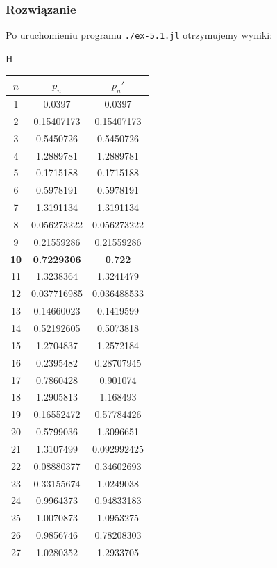 \documentclass[10pt]{article}
\begin{document}
\subsubsection{Rozwiązanie}

Po uruchomieniu programu \texttt{./ex-5.1.jl} otrzymujemy wyniki:
\begin{center}{H}
    \begin{tabular}{|c| c c |}
        \hline
        $n$ & $p_n$ & $p_n'$\\
        \hline\hline
        1 & 0.0397 & 0.0397\\
        2 & 0.15407173 & 0.15407173\\
        3 & 0.5450726 & 0.5450726\\
        4 & 1.2889781 & 1.2889781\\
        5 & 0.1715188 & 0.1715188\\
        6 & 0.5978191 & 0.5978191\\
        7 & 1.3191134 & 1.3191134\\
        8 & 0.056273222 & 0.056273222\\
        9 & 0.21559286 & 0.21559286\\
        \textbf{10} & \textbf{0.7229306} & \textbf{0.722}\\
        11 & 1.3238364 & 1.3241479\\
        12 & 0.037716985 & 0.036488533\\
        13 & 0.14660023 & 0.1419599\\
        14 & 0.52192605 & 0.5073818\\
        15 & 1.2704837 & 1.2572184\\
        16 & 0.2395482 & 0.28707945\\
        17 & 0.7860428 & 0.901074\\
        18 & 1.2905813 & 1.168493\\
        19 & 0.16552472 & 0.57784426\\
        20 & 0.5799036 & 1.3096651\\
        21 & 1.3107499 & 0.092992425\\
        22 & 0.08880377 & 0.34602693\\
        23 & 0.33155674 & 1.0249038\\
        24 & 0.9964373 & 0.94833183\\
        25 & 1.0070873 & 1.0953275\\
        26 & 0.9856746 & 0.78208303\\
        27 & 1.0280352 & 1.2933705\\

\end{tabular}
\end{center}
\end{document}
